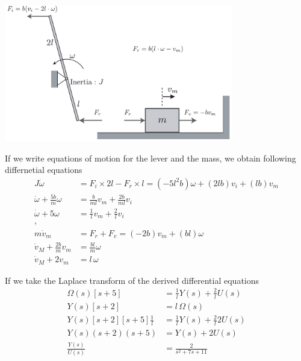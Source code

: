 \documentclass[twoside]{article}
\theoremstyle{definition}
\begin{document}
\vspace{12pt}
  
\begin{minipage}[h]{1\linewidth}
    \begin{center}
      \includegraphics[width=0.75\textwidth]{lever_solution}
    \end{center}
\end{minipage}   

\vspace{12pt}

If we write equations of motion for the lever and the mass, 
we obtain following differnetial equations
%
\begin{align*}
  J \dot{\omega} &= F_i \times 2l - F_r \times l  = (- 5 l^2 b) \omega + (2 l b) v_i + (l b) v_m 
  \\
\dot{\omega} + \frac{5 b}{m} \omega &= \frac{b}{m l} v_m + \frac{2
                                          b}{m l} v_i
  \\
\dot{\omega} + 5 \omega &= \frac{1}{l} v_m + \frac{2}{l} v_i
\\
,
\\
m \dot{v}_m &= F_r + F_v  = (- 2 b) v_m + ( b l ) \omega
\\
 \dot{v}_M + \frac{2 b}{m} v_m  &= \frac{ b l }{m} \omega
\\
 \dot{v}_M + 2 v_m  &= l \, \omega
\end{align*}

If we take the Laplace transform of the derived differential equations
%
\begin{align*}
\Omega(s) \left[ s + 5 \right] &= \frac{1}{l} Y(s) + \frac{2}{l} U(s)
\\
Y(s) \left[ s + 2 \right] &= l \, \Omega(s)
\\
Y(s) \left[ s + 2 \right]\left[ s + 5 \right] \frac{1}{l} &=
                                                            \frac{1}{l}
                                                            Y(s) +
                                                            \frac{2}{l}
                                                           2 U(s)
\\
Y(s) ( s + 2 ) ( s + 5 ) &= Y(s) + 2 U(s)
\\
\frac{Y(s)}{U(s)} &= \frac{2}{s^2 + 7 s + 11}
\end{align*}
\end{document}
